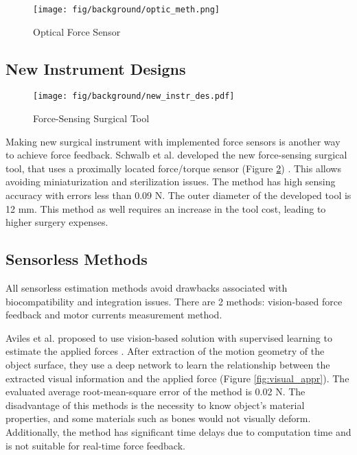 \begin{figure}[h]
	\begin{center}
	\texttt{[image: fig/background/optic\_meth.png]}
	\end{center}
	\vspace{-4mm}
	\caption[Optical Force Sensor]
	{Optical Force Sensor \cite{_micro_2004}}
	\label{fig:opt_sen}
	\vspace{-2mm}
\end{figure}

\subsection{New Instrument Designs}
\begin{figure}[h]
	\begin{center}
	\texttt{[image: fig/background/new\_instr\_des.pdf]}
	\end{center}
	\vspace{-4mm}
	\caption[Force-Sensing Surgical Tool]
	{ Force-Sensing Surgical Tool \cite{schwalb_forcesensing_2017}}
	\label{fig:force_sen_tool}
	\vspace{-2mm}
\end{figure}

Making new surgical instrument with implemented force sensors is another way to achieve force feedback. Schwalb et al. developed the new force-sensing surgical tool, that uses a proximally located force/torque sensor (Figure \ref{fig:force_sen_tool}) \cite{schwalb_forcesensing_2017}. This allows avoiding miniaturization and sterilization issues. The method has high sensing accuracy with errors less than 0.09 N. The outer diameter of the developed tool is 12 mm. This method as well requires an increase in the tool cost, leading to higher surgery expenses.

\subsection{Sensorless Methods}

All sensorless estimation methods avoid drawbacks associated with biocompatibility and integration issues. There are 2 methods: vision-based force feedback and motor currents measurement method.

Aviles et al. proposed to use vision-based solution with supervised learning to estimate the applied forces \cite{aviles_towards_2017}. After extraction of the motion geometry of the object surface, they use a deep network to learn the relationship between the extracted visual information and the applied force (Figure \ref{fig:visual_appr}). The evaluated average root-mean-square error of the method is 0.02 N.  The disadvantage of this methods is the necessity to know object's material properties, and some materials such as bones would not visually deform. Additionally, the method has significant time delays due to computation time and is not suitable for real-time force feedback. 

